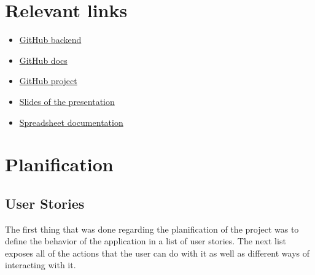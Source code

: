 \documentclass[./main.tex]{subfiles}
\begin{document}
\section{Relevant links}

\begin{itemize}
	\item \href{https://github.com/commed-it/backend}{GitHub backend}
	\item \href{https://github.com/commed-it/docs}{GitHub docs}
	\item \href{https://github.com/orgs/commed-it/projects/1}{GitHub project}
	\item \href{https://drive.google.com/drive/folders/15iM-Fm6krEBcHkVyaqSUfjJMY1MKBMm6?usp=sharing}{Slides of the presentation}
	\item \href{https://docs.google.com/spreadsheets/d/1qyKpYXf7lZ2p7q09JHzv7e7yGVBiPEqGNHhwPsFYcXc/edit?usp=sharing}{Spreadsheet documentation}
\end{itemize}

\section{Planification}

\subsection{User Stories}

The first thing that was done regarding the planification of the project
was to define the behavior of the application in a list of user stories.
The next list exposes all of the actions that the user can do with it as
well as different ways of interacting with it.
\end{document}
